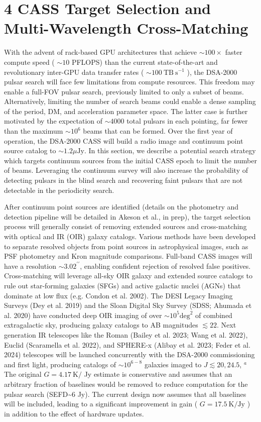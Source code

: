 \documentclass[10pt]{article}
\begin{document}
\section*{4 CASS Target Selection and Multi-Wavelength Cross-Matching}
With the advent of rack-based GPU architectures that achieve \(\sim 100 \times\) faster compute speed ( \(\sim 10\) PFLOPS) than the current state-of-the-art and revolutionary inter-GPU data transfer rates ( \(\sim 100 \mathrm{~TB} \mathrm{~s}{ }^{-1}\) ), the DSA-2000 pulsar search will face few limitations from compute resources. This freedom may enable a full-FOV pulsar search, previously limited to only a subset of beams. Alternatively, limiting the number of search beams could enable a dense sampling of the period, DM, and acceleration parameter space. The latter case is further motivated by the expectation of \(\sim 4000\) total pulsars in each pointing, far fewer than the maximum \(\sim 10^{6}\) beams that can be formed. Over the first year of operation, the DSA-2000 CASS will build a radio image and continuum point source catalog to \(\sim 1.2 \mu \mathrm{Jy}\). In this section, we describe a potential search strategy which targets continuum sources from the initial CASS epoch to limit the number of beams. Leveraging the continuum survey will also increase the probability of detecting pulsars in the blind search and recovering faint pulsars that are not detectable in the periodicity search.

After continuum point sources are identified (details on the photometry and detection pipeline will be detailed in Akeson et al., in prep), the target selection process will generally consist of removing extended sources and cross-matching with optical and IR (OIR) galaxy catalogs. Various methods have been developed to separate resolved objects from point sources in astrophysical images, such as PSF photometry and Kron magnitude comparisons. Full-band CASS images will have a resolution \(\sim 3.02^{\prime \prime}\), enabling confident rejection of resolved false positives. Cross-matching will leverage all-sky OIR galaxy and extended source catalogs to rule out star-forming galaxies (SFGs) and active galactic nuclei (AGNs) that dominate at low flux (e.g. Condon et al. 2002). The DESI Legacy Imaging Surveys (Dey et al. 2019) and the Sloan Digital Sky Survey (SDSS; Ahumada et al. 2020) have conducted deep OIR imaging of over \(\sim 10^{5} \mathrm{deg}^{2}\) of combined extragalactic sky, producing galaxy catalogs to AB magnitudes \(\lesssim 22\). Next generation IR telescopes like the Roman (Bailey et al. 2023; Wang et al. 2022), Euclid (Scaramella et al. 2022), and SPHERE-x (Alibay et al. 2023; Feder et al. 2024) telescopes will be launched concurrently with the DSA-2000 commissioning and first light, producing catalogs of \(\sim 10^{6-8}\) galaxies imaged to \(J \lesssim 20,24.5\), \({ }^{a}\) The original \(G=4.17 \mathrm{~K} /\) Jy estimate is conservative and assumes that an arbitrary fraction of baselines would be removed to reduce computation for the pulsar search (SEFD\~{}6 Jy). The current design now assumes that all baselines will be included, leading to a significant improvement in gain ( \(G=17.5 \mathrm{~K} / \mathrm{Jy}\) ) in addition to the effect of hardware updates.
\end{document}
